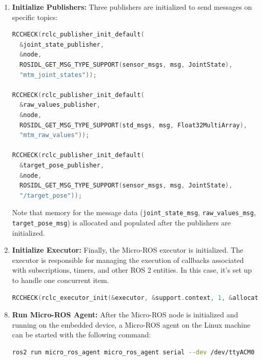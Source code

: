\begin{enumerate}
    \item \textbf{Initialize Publishers:}
    Three publishers are initialized to send messages on specific topics:

\begin{lstlisting}[language=C++, caption={Initialize Micro-ROS Publishers}, label={lst:microros_publishers}]
RCCHECK(rclc_publisher_init_default(
  &joint_state_publisher,
  &node,
  ROSIDL_GET_MSG_TYPE_SUPPORT(sensor_msgs, msg, JointState),
  "mtm_joint_states"));

RCCHECK(rclc_publisher_init_default(
  &raw_values_publisher,
  &node,
  ROSIDL_GET_MSG_TYPE_SUPPORT(std_msgs, msg, Float32MultiArray),
  "mtm_raw_values"));

RCCHECK(rclc_publisher_init_default(
  &target_pose_publisher,
  &node,
  ROSIDL_GET_MSG_TYPE_SUPPORT(sensor_msgs, msg, JointState),
  "/target_pose"));
\end{lstlisting}
    Note that memory for the message data (\texttt{joint\_state\_msg}, \texttt{raw\_values\_msg}, \texttt{target\_pose\_msg}) is allocated and populated after the publishers are initialized.

    \item \textbf{Initialize Executor:}
    Finally, the Micro-ROS executor is initialized. The executor is responsible for managing the execution of callbacks associated with subscriptions, timers, and other ROS 2 entities. In this case, it's set up to handle one concurrent item.
\begin{lstlisting}[language=C++, caption={Initialize Micro-ROS Executor}, label={lst:microros_executor_init}]
RCCHECK(rclc_executor_init(&executor, &support.context, 1, &allocator));
\end{lstlisting}
\end{enumerate}




\begin{enumerate}
    \setcounter{enumi}{7} %
    \item \textbf{Run Micro-ROS Agent:} After the Micro-ROS node is initialized and running on the embedded device, a Micro-ROS agent on the Linux machine can be started with the following command:
\begin{lstlisting}[language=bash, caption={Run Micro-ROS Agent Command}, label={lst:microros_agent_command}]
ros2 run micro_ros_agent micro_ros_agent serial --dev /dev/ttyACM0
\end{lstlisting}
\end{enumerate}

